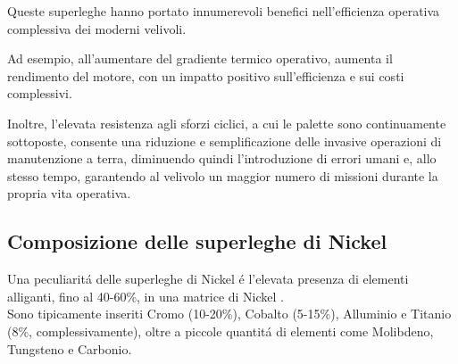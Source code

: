 \documentclass{article}
\begin{document}
    Queste superleghe hanno portato innumerevoli benefici nell'efficienza operativa
    complessiva dei moderni velivoli.

    Ad esempio, all'aumentare del gradiente termico operativo, aumenta il rendimento del motore, 
    con un impatto positivo sull'efficienza e sui costi complessivi.

    Inoltre, l'elevata resistenza agli sforzi ciclici, a cui le palette sono 
    continuamente sottoposte, consente una riduzione e semplificazione delle invasive operazioni
    di manutenzione a terra, diminuendo quindi l'introduzione di errori umani e, allo stesso
    tempo, garantendo al velivolo un maggior numero di missioni durante la propria vita operativa.






    \clearpage

        \subsection{Composizione delle superleghe di Nickel\label{Nickel_composizione}}

        Una peculiaritá delle superleghe di Nickel é l'elevata presenza di elementi alliganti, fino 
        al 40-60\%, in una matrice di Nickel \autocite{Mouritz}. \\ 

        Sono tipicamente inseriti Cromo (10-20\%),
        Cobalto (5-15\%), Alluminio e Titanio (8\%, complessivamente), oltre
        a piccole quantitá di elementi
        come Molibdeno, Tungsteno e Carbonio. \\ \\ 
\end{document}
